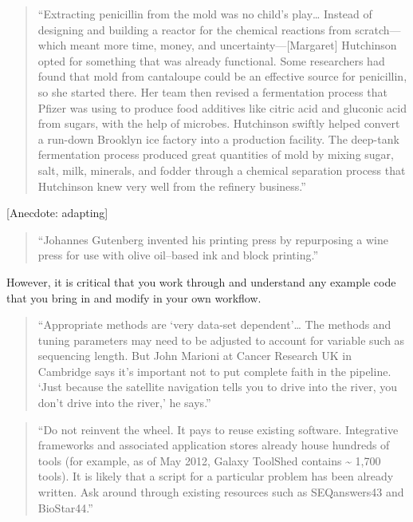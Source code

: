 \documentclass[]{tufte-book}
\begin{document}
\begin{quote}
``Extracting penicillin from the mold was no child's play\ldots{} Instead of
designing and building a reactor for the chemical reactions from scratch---which
meant more time, money, and uncertainty---{[}Margaret{]} Hutchinson opted for something
that was already functional. Some researchers had found that mold from
cantaloupe could be an effective source for penicillin, so she started
there. Her team then revised a fermentation process that Pfizer was using to
produce food additives like citric acid and gluconic acid from sugars, with
the help of microbes. Hutchinson swiftly helped convert a run-down
Brooklyn ice factory into a production facility. The deep-tank fermentation
process produced great quantities of mold by mixing sugar, salt, milk, minerals,
and fodder through a chemical separation process that Hutchinson knew very
well from the refinery business.'' \citep{madhavan2015applied}
\end{quote}

{[}Anecdote: adapting{]}

\begin{quote}
``Johannes Gutenberg invented his printing press by repurposing a wine
press for use with olive oil--based ink and block printing.'' \citep{madhavan2015applied}
\end{quote}

However, it is critical that you work through and understand any example code
that you bring in and modify in your own workflow.

\begin{quote}
``Appropriate methods are `very data-set dependent'\ldots{} The methods and tuning
parameters may need to be adjusted to account for variable such as sequencing
length. But John Marioni at Cancer Research UK in Cambridge says it's important not
to put complete faith in the pipeline. `Just because the satellite navigation
tells you to drive into the river, you don't drive into the river,' he says.''
\citep{perkel2017single}
\end{quote}

\begin{quote}
``Do not reinvent the wheel. It pays to reuse existing software. Integrative
frameworks and associated application stores already house hundreds of tools
(for example, as of May 2012, Galaxy ToolShed contains \textasciitilde{} 1,700 tools). It is
likely that a script for a particular problem has been already written. Ask
around through existing resources such as SEQanswers43 and BioStar44.''
\citep{nekrutenko2012next}
\end{quote}
\end{document}
